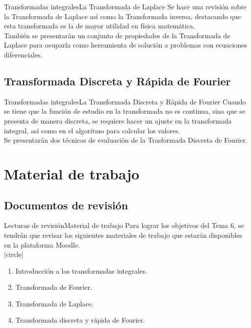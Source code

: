 \documentclass[10pt]{beamer}
\begin{document}
\begin{frame}{Transformadas integrales}{La Transformada de Laplace}
Se hace una revisión sobre la Transformada de Laplace así como la Transformada inversa, destacando que esta transformada es la de mayor utilidad en física matemática.
\\
\bigskip
\pause
También se presentarán un conjunto de propiedades de la Transformada de Laplace para ocuparla como herramienta de solución a problemas con ecuaciones diferenciales.
\end{frame}
\subsection{Transformada Discreta y Rápida de Fourier}

\begin{frame}{Transformadas integrales}{La Transformada Discreta y Rápida de Fourier}
Cuando se tiene que la función de estudio en la transformada no es continua, sino que se presenta de manera discreta, se requiere hacer un ajuste en la transformada integral, así como en el algoritmo para calcular los valores.
\\
\bigskip
\pause
Se presentarán dos técnicas de evaluación de la Trasformada Discreta de Fourier.
\end{frame}

\section{Material de trabajo}
\subsection{Documentos de revisión}

\begin{frame}{Lecturas de revisión}{Material de trabajo}
Para lograr los objetivos del Tema 6, se tendrán que revisar los siguientes materiales de trabajo que estarán disponibles en la plataforma Moodle.
\\
\bigskip
\pause
{}
[circle]
\begin{enumerate}[<+->]
\item Introducción a las transformadas integrales.
\item Transformada de Fourier.
\item Transformada de Laplace.
\item Transformada discreta y rápida de Fourier.
\end{enumerate}
\end{frame}
\end{document}

